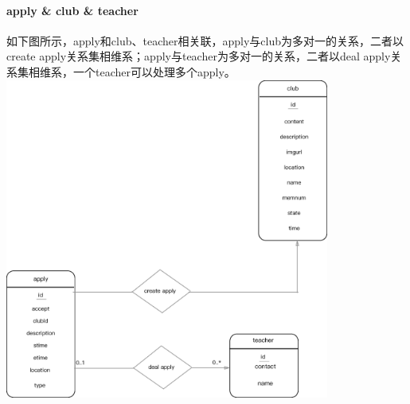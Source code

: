 \documentclass[UTF8]{ctexart}
\begin{document}
\paragraph{apply \& club \& teacher}
如下图所示，apply和club、teacher相关联，apply与club为多对一的关系，二者以create apply关系集相维系；apply与teacher为多对一的关系，二者以deal apply关系集相维系，一个teacher可以处理多个apply。
\newline
\includegraphics[width = 0.8\textwidth]{apply-*-er.eps}
\end{document}
